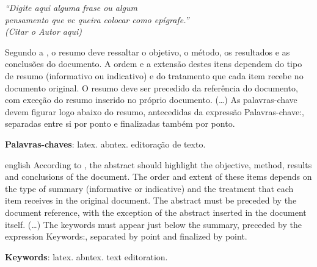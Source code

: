 \documentclass[12pt,oneside,a4paper,chapter=TITLE,english,brazil]{abntex2}
\begin{document}
\begin{epigrafe}
    \vspace*{\fill}
	\begin{flushright}
		\textit{``Digite aqui alguma frase ou algum \\
		pensamento que vc queira colocar como epígrafe.'' \\
		(Citar o Autor aqui)}
	\end{flushright}
\end{epigrafe}



\setlength{\absparsep}{18pt} %
\begin{resumo}
 Segundo a , o resumo deve ressaltar o objetivo, o método, os resultados e as conclusões do documento. A ordem e a extensão destes itens dependem do tipo de resumo (informativo ou indicativo) e do tratamento que cada item recebe no documento original. O resumo deve ser precedido da referência do documento, com exceção do resumo inserido no próprio documento. (\ldots) As palavras-chave devem figurar logo abaixo do resumo, antecedidas da expressão Palavras-chave:, separadas entre si por ponto e finalizadas também por ponto.

 \textbf{Palavras-chaves}: latex. abntex. editoração de texto.
\end{resumo}

\begin{resumo}[Abstract]
 \begin{otherlanguage*}{english}
   According to , the abstract should highlight the objective, method, results and conclusions of the document. The order and extent of these items depends on the type of summary (informative or indicative) and the treatment that each item receives in the original document. The abstract must be preceded by the document reference, with the exception of the abstract inserted in the document itself. (\ldots) The keywords must appear just below the summary, preceded by the expression Keywords:, separated by point and finalized by point.
 
   \textbf{Keywords}: latex. abntex. text editoration.
 \end{otherlanguage*}
\end{resumo}
\end{document}
